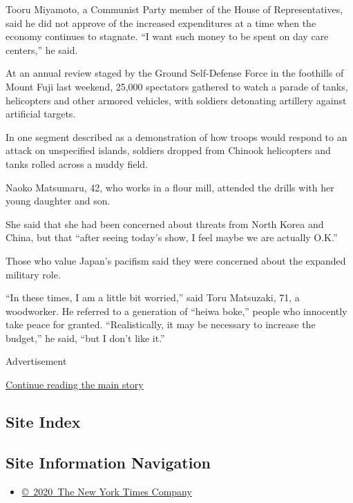 Tooru Miyamoto, a Communist Party member of the House of
Representatives, said he did not approve of the increased expenditures
at a time when the economy continues to stagnate. ``I want such money to
be spent on day care centers,'' he said.

At an annual review staged by the Ground Self-Defense Force in the
foothills of Mount Fuji last weekend, 25,000 spectators gathered to
watch a parade of tanks, helicopters and other armored vehicles, with
soldiers detonating artillery against artificial targets.

In one segment described as a demonstration of how troops would respond
to an attack on unspecified islands, soldiers dropped from Chinook
helicopters and tanks rolled across a muddy field.

Naoko Matsumaru, 42, who works in a flour mill, attended the drills with
her young daughter and son.

She said that she had been concerned about threats from North Korea and
China, but that ``after seeing today's show, I feel maybe we are
actually O.K.''

Those who value Japan's pacifism said they were concerned about the
expanded military role.

``In these times, I am a little bit worried,'' said Toru Matsuzaki, 71,
a woodworker. He referred to a generation of ``heiwa boke,'' people who
innocently take peace for granted. ``Realistically, it may be necessary
to increase the budget,'' he said, ``but I don't like it.''

Advertisement

\protect\hyperlink{after-bottom}{Continue reading the main story}

\hypertarget{site-index}{%
\subsection{Site Index}\label{site-index}}

\hypertarget{site-information-navigation}{%
\subsection{Site Information
Navigation}\label{site-information-navigation}}

\begin{itemize}
\tightlist
\item
  \href{https://help.nytimes3xbfgragh.onion/hc/en-us/articles/115014792127-Copyright-notice}{©~2020~The
  New York Times Company}
\end{itemize}

